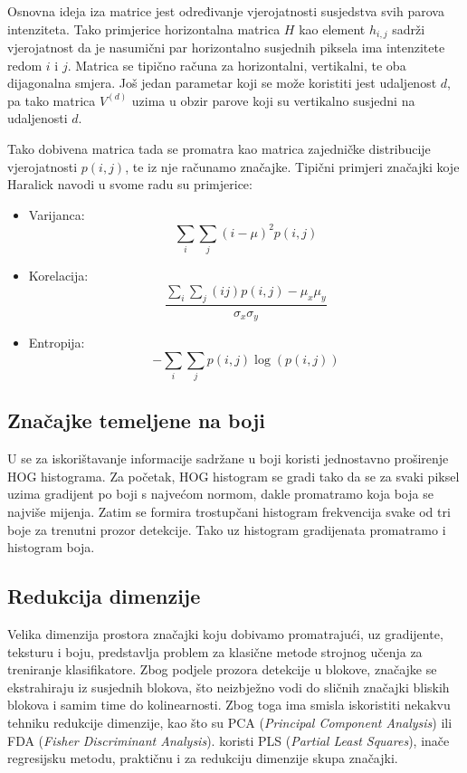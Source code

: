 \documentclass[seminar]{fer}
\begin{document}
Osnovna ideja iza matrice jest određivanje vjerojatnosti susjedstva svih parova intenziteta. Tako primjerice horizontalna matrica $H$ kao element
$h_{i,j}$ sadrži vjerojatnost da je nasumični par horizontalno susjednih piksela ima intenzitete redom $i$ i $j$. Matrica se tipično računa za horizontalni, vertikalni, te oba dijagonalna smjera. Još jedan parametar koji se može koristiti jest udaljenost $d$, pa tako matrica $V^{(d)}$ uzima u obzir 
parove koji su vertikalno susjedni na udaljenosti $d$.


Tako dobivena matrica tada se promatra kao matrica zajedničke distribucije vjerojatnosti $p(i, j)$, te iz nje računamo značajke. Tipični
primjeri značajki koje Haralick navodi u svome radu su primjerice:

\begin{itemize}
  \item
  Varijanca: $$\sum_{i}\sum_{j}(i - \mu)^2p(i, j)$$
  \item
  Korelacija: $$\frac{\sum_{i}\sum_{j}(ij)p(i,j) - \mu_{x}\mu_{y}}{\sigma_{x}\sigma_{y}}$$
  \item
  Entropija: $$-\sum_{i}\sum_{j}p(i, j)\log(p(i, j))$$
\end{itemize}

\subsection{Značajke temeljene na boji}


U \cite{Schwartz} se za iskorištavanje informacije sadržane u boji koristi jednostavno proširenje HOG histograma. Za početak, HOG histogram se gradi tako da se za
svaki piksel uzima gradijent po boji s najvećom normom, dakle promatramo koja boja se najviše mijenja. Zatim se formira trostupčani histogram frekvencija svake od tri boje za trenutni prozor detekcije. Tako uz histogram gradijenata promatramo i histogram boja.


\subsection{Redukcija dimenzije}


Velika dimenzija prostora značajki koju dobivamo promatrajući, uz gradijente, teksturu i boju, predstavlja problem za klasične metode strojnog učenja
za treniranje klasifikatore. Zbog podjele prozora detekcije u blokove, značajke se ekstrahiraju iz susjednih blokova, što neizbježno vodi do
sličnih značajki bliskih blokova i samim time do kolinearnosti. Zbog toga ima smisla iskoristiti nekakvu tehniku redukcije dimenzije, kao što su
PCA (\emph{Principal Component Analysis}) ili FDA (\emph{Fisher Discriminant Analysis}). \cite{Schwartz} koristi PLS (\emph{Partial Least Squares}), inače 
regresijsku metodu, praktičnu i za redukciju dimenzije skupa značajki. 
\end{document}
